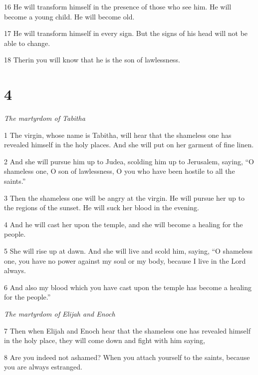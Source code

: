 \par 16 He will transform himself in the presence of those who see him. He will become a young child. He will become old.

\par 17 He will transform himself in every sign. But the signs of his head will not be able to change.

\par 18 Therin you will know that he is the son of lawlessness.

\chapter{4}

\par \textit{The martyrdom of Tabitha}

\par 1 The virgin, whose name is Tabitha, will hear that the shameless one has revealed himself in the holy places. And she will put on her garment of fine linen.

\par 2 And she will pursue him up to Judea, scolding him up to Jerusalem, saying, “O shameless one, O son of lawlessness, O you who have been hostile to all the saints.”

\par 3 Then the shameless one will be angry at the virgin. He will pursue her up to the regions of the sunset. He will suck her blood in the evening.

\par 4 And he will cast her upon the temple, and she will become a healing for the people.

\par 5 She will rise up at dawn. And she will live and scold him, saying, “O shameless one, you have no power against my soul or my body, because I live in the Lord always.

\par 6 And also my blood which you have cast upon the temple has become a healing for the people.”


\par \textit{The martyrdom of Elijah and Enoch}

\par 7 Then when Elijah and Enoch hear that the shameless one has revealed himself in the holy place, they will come down and fight with him saying,

\par 8 Are you indeed not ashamed? When you attach yourself to the saints, because you are always estranged.

